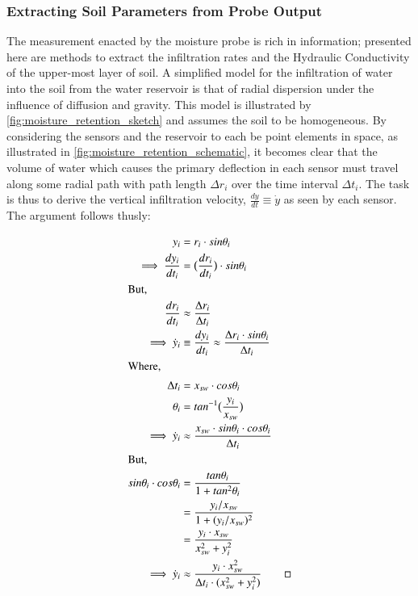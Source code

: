 \subsubsection{Extracting Soil Parameters from Probe Output}
\label{sec:Extracting_Soil_params}
The measurement enacted by the moisture probe is rich in information; presented here are methods to extract the infiltration rates and the Hydraulic Conductivity of the upper-most layer of soil.
\newline
A simplified model for the infiltration of water into the soil from the water reservoir is that of radial dispersion under the influence of diffusion and gravity. This model is illustrated by \cref{fig:moisture_retention_sketch} and assumes the soil to be homogeneous. By considering the sensors and the reservoir to each be point elements in space, as illustrated in \cref{fig:moisture_retention_schematic}, it becomes clear that the volume of water which causes the primary deflection in each sensor must travel along some radial path with path length $\Delta r_i$ over the time interval $\Delta t_i$. The task is thus to derive the vertical infiltration velocity, $\frac{dy}{dt} \equiv \dot{y}$ as seen by each sensor. The argument follows thusly:

\begin{align}
    y_i &= r_i\cdot sin\theta_i \\
    \implies \frac{dy_i}{dt_i} &= \big(\frac{dr_i}{dt_i}\big)\cdot sin\theta_i \\
    \intertext{But,} 
    \frac{dr_i}{dt_i} &\approx \frac{\Delta r_i}{\Delta t_i} \\
    \implies \dot{y}_i &\equiv \frac{dy_i}{dt_i} \approx \frac{\Delta r_i  \cdot sin\theta_i}{\Delta t_i}\\
    \intertext{Where,}
    \Delta t_i &= x_{sw} \cdot cos\theta_i \\
    \theta_i &= tan^{-1}\big(\frac{y_i}{x_{sw}}\big)\\
    \implies \dot{y}_i &\approx \frac{x_{sw} \cdot sin\theta_i\cdot cos\theta_i}{\Delta t_i}\\
    \intertext{But,}
    sin\theta_i \cdot cos\theta_i
    &= \frac{tan\theta_i}{1+tan^2\theta_i}\\
    &= \frac{y_i/x_{sw}}{1+(y_i/x_{sw})^2}\\
    &= \frac{y_i\cdot x_{sw}}{x^2_{sw}+y^2_i}\\
    \implies \dot{y}_i &\approx \frac{y_i\cdot x^2_{sw}}{\Delta t_i\cdot(x^2_{sw}+y^2_i)} \qed
\end{align}

